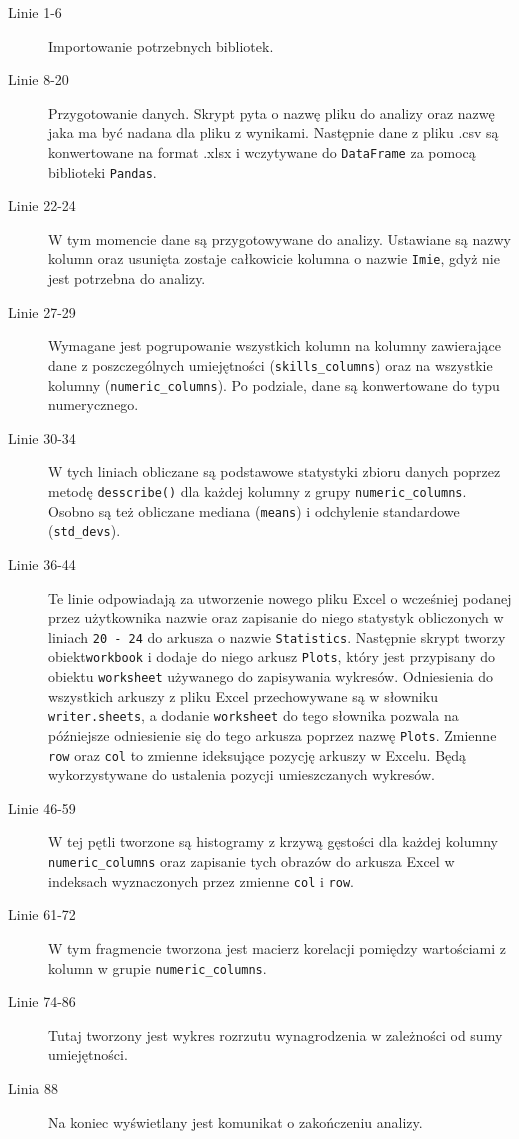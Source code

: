         \begin{description}
            \item[Linie 1-6] Importowanie potrzebnych bibliotek.
            \item[Linie 8-20] Przygotowanie danych. Skrypt pyta o nazwę pliku do analizy oraz nazwę jaka ma być nadana dla pliku z wynikami. Następnie dane z pliku .csv są konwertowane na format .xlsx i wczytywane do \verb|DataFrame| za pomocą biblioteki \verb|Pandas|.
            \item[Linie 22-24] W tym momencie dane są przygotowywane do analizy. Ustawiane są nazwy kolumn oraz usunięta zostaje całkowicie kolumna o nazwie \verb|Imie|, gdyż nie jest potrzebna do analizy. 
            \item[Linie 27-29] Wymagane jest pogrupowanie wszystkich kolumn na kolumny zawierające dane z poszczególnych umiejętności (\verb|skills_columns|) oraz na wszystkie kolumny (\verb|numeric_columns|). Po podziale, dane są konwertowane do typu numerycznego.
            \item[Linie 30-34] W tych liniach obliczane są podstawowe statystyki zbioru danych poprzez metodę \verb|desscribe()| dla każdej kolumny z grupy \verb|numeric_columns|. Osobno są też obliczane mediana (\verb|means|) i odchylenie standardowe (\verb|std_devs|).
            \item[Linie 36-44] Te linie odpowiadają za utworzenie nowego pliku Excel o wcześniej podanej przez użytkownika nazwie oraz zapisanie do niego statystyk obliczonych w liniach \verb|20 - 24| do arkusza o nazwie \verb|Statistics|. Następnie skrypt tworzy obiekt\verb|workbook| i dodaje do niego arkusz \verb|Plots|, który jest przypisany do obiektu \verb|worksheet| używanego do zapisywania wykresów. Odniesienia do wszystkich arkuszy z pliku Excel przechowywane są w słowniku \verb|writer.sheets|, a dodanie \verb|worksheet| do tego słownika pozwala na późniejsze odniesienie się do tego arkusza poprzez nazwę \verb|Plots|. Zmienne \verb|row| oraz \verb|col| to zmienne ideksujące pozycję arkuszy w Excelu. Będą wykorzystywane do ustalenia pozycji umieszczanych wykresów.
            \item[Linie 46-59] W tej pętli tworzone są histogramy z krzywą gęstości dla każdej kolumny \verb|numeric_columns| oraz zapisanie tych obrazów do arkusza Excel w indeksach wyznaczonych przez zmienne \verb|col| i \verb|row|.
            \item[Linie 61-72] W tym fragmencie tworzona jest macierz korelacji pomiędzy wartościami z kolumn w grupie \verb|numeric_columns|.
            \item[Linie 74-86] Tutaj tworzony jest wykres rozrzutu wynagrodzenia w zależności od sumy umiejętności.
            \item[Linia 88] Na koniec wyświetlany jest komunikat o zakończeniu analizy.
        \end{description}

